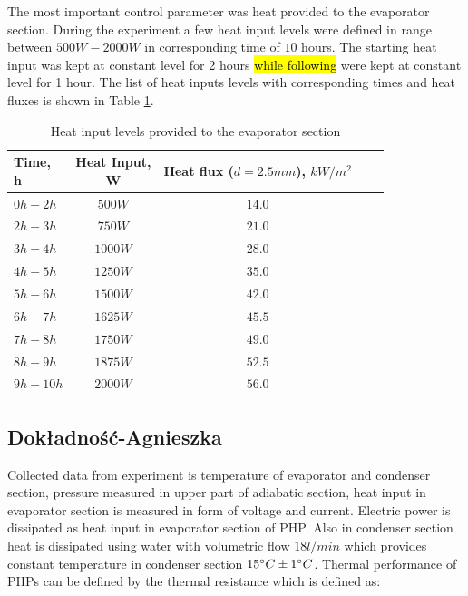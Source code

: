 \documentclass[article]{elsarticle}
\newcommand{\hlc}[2][yellow]{ {\sethlcolor{#1} \hl{#2}} }
\begin{document}
\indent The most important control parameter was heat provided to the evaporator section. During the experiment a few heat input levels were defined in range between $500 W - 2000 W$ in corresponding time of $10$ hours. The starting heat input was kept at constant level for 2 hours \hlc{while following} were kept at constant level for 1 hour. The list of heat inputs levels with corresponding times and heat fluxes is shown in Table  \ref{table:heatInputs}.

\begin{table}[H]
	\centering
	\caption{Heat input levels provided to the evaporator section}
	\begin{tabular}{lcccc}
	\hline
		\thead{Time,\\ h} & \thead{Heat Input,\\ W} & \thead{Heat flux ($d=2.5 mm$),\\ $kW/m^2$}\\
	\hline
		$0h - 2h$ & $500 W$ & $14.0$\\
		$2h - 3h$ & $750 W$ & $21.0$\\
		$3h - 4h$ & $1000 W$ & $28.0$\\
		$4h - 5h$ & $1250 W$ & $35.0$\\
        $5h - 6h$ & $1500 W$ & $42.0$\\
        $6h - 7h$ & $1625 W$ & $45.5$\\
        $7h - 8h$ & $1750 W$ & $49.0$\\
        $8h - 9h$ & $1875 W$ & $52.5$\\
        $9h - 10h$ & $2000 W$ & $56.0$\\
	\hline
	\end{tabular}
	\label{table:heatInputs}
\end{table}

\subsection{Dokładność-Agnieszka}

Collected data from experiment is temperature of evaporator and condenser section, pressure measured in upper part of adiabatic section, heat input in evaporator section is measured in form of voltage and current. Electric power is dissipated as heat input in evaporator section of PHP. Also in condenser section heat is dissipated using water with volumetric flow $18 l/min$ which provides constant temperature in condenser section $15 \degree C \pm 1 \degree C$. Thermal performance of PHPs can be defined by the thermal resistance which is defined as:
\end{document}
